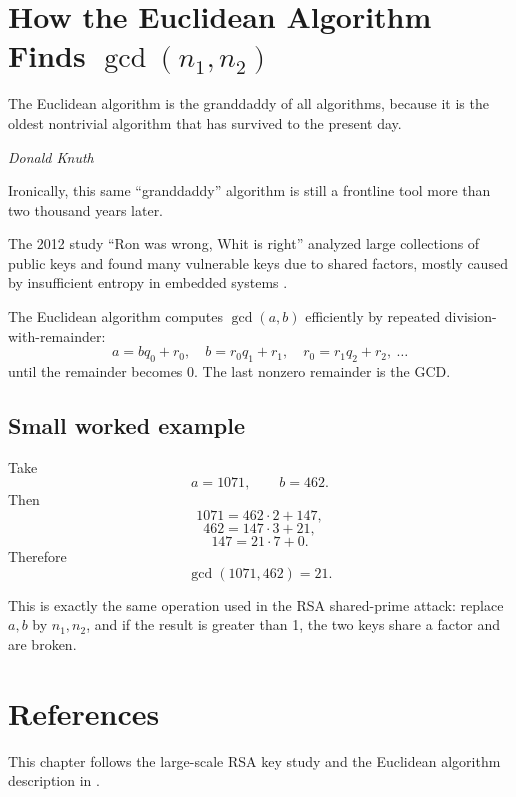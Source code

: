 \section{How the Euclidean Algorithm Finds \(\gcd(n_1,n_2)\)}
\epigraph{The Euclidean algorithm is the granddaddy of all algorithms, because it is the oldest nontrivial algorithm that has survived to the present day.}{\textit{Donald Knuth}}

Ironically, this same ``granddaddy'' algorithm is still a frontline tool more
than two thousand years later.

The 2012 study ``Ron was wrong, Whit is right'' analyzed large collections of
public keys and found many vulnerable keys due to shared factors, mostly caused
by insufficient entropy in embedded systems \cite{lenstra:ron-was-wrong}.

The Euclidean algorithm computes \(\gcd(a,b)\) efficiently by repeated
division-with-remainder:
\[
a=bq_0+r_0,\quad
b=r_0q_1+r_1,\quad
r_0=r_1q_2+r_2,\ \dots
\]
until the remainder becomes \(0\). The last nonzero remainder is the GCD.

\subsection*{Small worked example}
Take
\[
a=1071,\qquad b=462.
\]
Then
\[
1071=462\cdot2+147,
\]
\[
462=147\cdot3+21,
\]
\[
147=21\cdot7+0.
\]
Therefore
\[
\gcd(1071,462)=21.
\]

This is exactly the same operation used in the RSA shared-prime attack:
replace \(a,b\) by \(n_1,n_2\), and if the result is greater than 1, the two
keys share a factor and are broken.


\section*{References}
This chapter follows the large-scale RSA key study \cite{lenstra:ron-was-wrong}
and the Euclidean algorithm description in \cite{wiki:euclidean-algorithm}.
